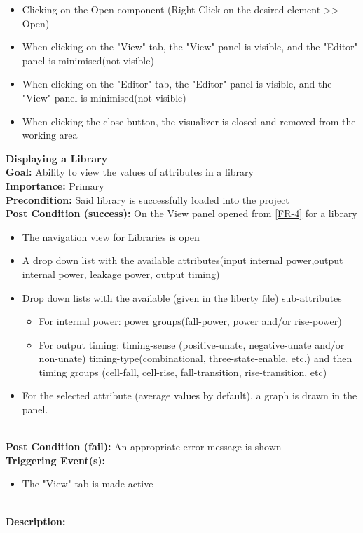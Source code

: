 \documentclass[10pt,a4paper]{report}
\newcommand{\precondition}[1]{
    \textbf{Precondition: } #1 \leavevmode \\
}
\newcommand{\FRDescription}[8]{
    \textbf{#1} \leavevmode \\
    \textbf{Goal: } #2 \leavevmode \\
    \textbf{Importance: } #3 \leavevmode \\
    \precondition{#4}
    \textbf{Post Condition (success): } #5 \leavevmode \\
    \textbf{Post Condition (fail): } #6 \leavevmode \\
    \textbf{Triggering Event(s): } #7 \leavevmode \\
    \textbf{Description: } \leavevmode \\ 
    #8}
\begin{document}
\begin{FR}
{\begin{itemize}
        \item Clicking on the Open component (Right-Click on the desired element >> Open)
    \end{itemize}}
    {\begin{itemize}
        \item When clicking on the "View" tab, the "View" panel is visible, and the "Editor" panel is minimised(not visible)
        \item When clicking on the "Editor" tab, the "Editor" panel is visible, and the "View" panel is minimised(not visible)
        \item When clicking the close button, the visualizer is closed and removed from the working area 
    \end{itemize}}
    \item \FRDescription{Displaying a Library\label{FR-5}}
    {Ability to view the values of attributes in a library}
    {Primary}
    {Said library is successfully loaded into the project}
    {On the View panel opened from \ref{FR-4} for a library
        \begin{itemize}
            \item The navigation view for Libraries is open
            \item A drop down list with the available attributes(input internal power,output internal power, leakage power, output timing)
            \item Drop down lists with the available (given in the liberty file) sub-attributes
            \begin{itemize}
                \item For internal power: power groups(fall-power, power and/or rise-power)
                \item For output timing: timing-sense (positive-unate, negative-unate and/or non-unate) timing-type(combinational, three-state-enable, etc.) and then timing groups (cell-fall, cell-rise, fall-transition, rise-transition, etc)
            \end{itemize}
            \item For the selected attribute (average values by default), a graph is drawn in the panel.
        \end{itemize}}
    {An appropriate error message is shown}
    {\begin{itemize}
        \item The "View" tab is made active
    \end{itemize}}
    {\begin{itemize}

\end{itemize}}
\end{FR}
\end{document}
